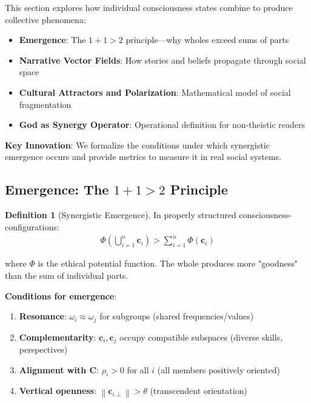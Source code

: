 \documentclass[11pt,a4paper]{article}
\theoremstyle{definition}
\newtheorem{definition}{Definition}[section]
\theoremstyle{remark}
\newcommand{\cc}{\mathbf{c}}
\newcommand{\norm}[1]{\left\|#1\right\|}
\begin{document}
\begin{enumerate}
\begin{mdframed}[backgroundcolor=cyan!5,linewidth=2pt]
This section explores how individual consciousness states combine to produce collective phenomena:

\begin{itemize}[nosep]
    \item \textbf{Emergence}: The \(1+1 > 2\) principle—why wholes exceed sums of parts
    \item \textbf{Narrative Vector Fields}: How stories and beliefs propagate through social space
    \item \textbf{Cultural Attractors and Polarization}: Mathematical model of social fragmentation
    \item \textbf{God as Synergy Operator}: Operational definition for non-theistic readers
\end{itemize}

\textbf{Key Innovation}: We formalize the conditions under which synergistic emergence occurs and provide metrics to measure it in real social systems.
\end{mdframed}

\subsection{Emergence: The \(1+1 > 2\) Principle}

\begin{definition}[Synergistic Emergence]
In properly structured consciousness-configurations:
\begin{align}
\Phi\left(\bigcup_{i=1}^n \cc_i\right) > \sum_{i=1}^n \Phi(\cc_i)
\end{align}

where \(\Phi\) is the ethical potential function. The whole produces more "goodness" than the sum of individual parts.

\textbf{Conditions for emergence}:
\begin{enumerate}
    \item \textbf{Resonance}: \(\omega_i \approx \omega_j\) for subgroups (shared frequencies/values)
    \item \textbf{Complementarity}: \(\cc_i, \cc_j\) occupy compatible subspaces (diverse skills, perspectives)
    \item \textbf{Alignment with \(\mathbf{C}\)}: \(\rho_i > 0\) for all \(i\) (all members positively oriented)
    \item \textbf{Vertical openness}: \(\norm{\cc_{i\perp}} > \theta\) (transcendent orientation)
\end{enumerate}


\end{definition}
\end{enumerate}
\end{document}
